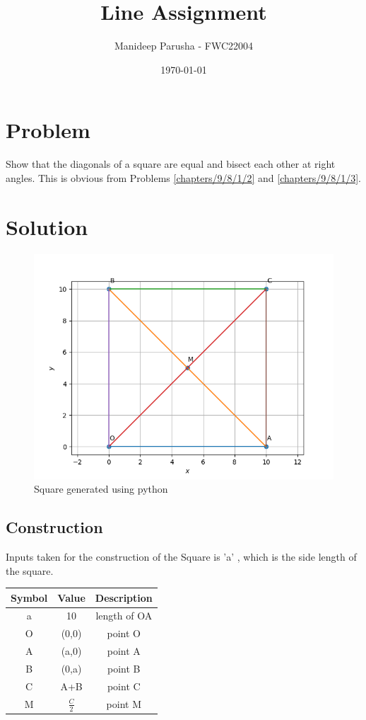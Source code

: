 \documentclass[journal,12pt,twocolumn]{article}
\title{\textbf{Line Assignment}}
\author{Manideep Parusha - FWC22004}
\date{\today}
\begin{document}
\maketitle
\section*{Problem}
\fi
Show that the diagonals of a square are equal and bisect each other at right angles.
\solution This is obvious from Problems
\eqref{chapters/9/8/1/2}
and
\eqref{chapters/9/8/1/3}.

\iffalse
\section*{Solution}

\begin{figure}[h]
\centering
\includegraphics[width=\columnwidth]{figs/sq_plot.png}
\caption{Square generated using python}
\label{fig:sq_py}
\end{figure}

\subsection*{Construction}
Inputs taken for the construction of the Square is 'a' , which is the side length of the square.
\begin{table}[h]
	\centering
\setlength\extrarowheight{2pt}
	\begin{tabular}{|c|c|c|}
		\hline
		\textbf{Symbol} & \textbf{Value} & \textbf{Description} \\
		\hline
		a & 10 & length of OA\\
		\hline
		O & (0,0) & point O\\
		\hline
		A & (a,0) & point A\\
		\hline
		B & (0,a) & point B\\
		\hline
		C & A+B & point C\\
		\hline
		M & $\frac{C}{2}$ & point M\\
		\hline
	\end{tabular}
\end{table}
\end{document}

